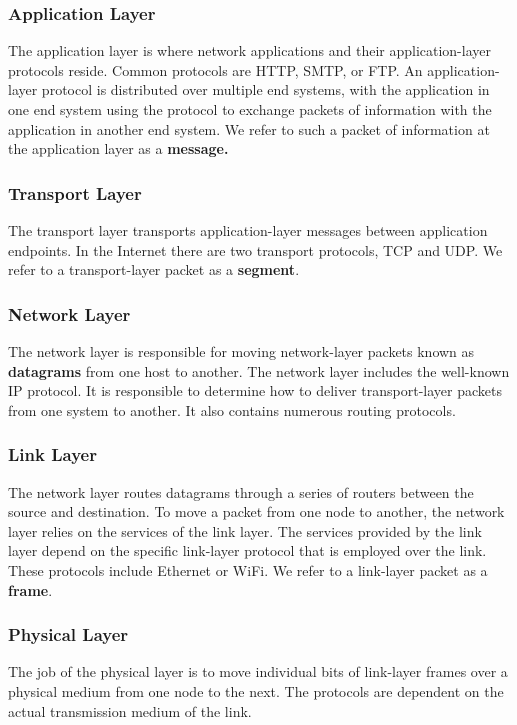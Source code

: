 \subsubsection{Application Layer}
The application layer is where network applications and their application-layer protocols reside. Common protocols are HTTP, SMTP, or FTP. An application-layer protocol is distributed over multiple end systems, with the application in one end system using the protocol to exchange packets of information with the application in another end system. We refer to such a packet of information at the application layer as a \textbf{message.}

\subsubsection{Transport Layer}
The transport layer transports application-layer messages between application endpoints. In the Internet there are two transport protocols, TCP and UDP. We refer to a transport-layer packet as a \textbf{segment}.

\subsubsection{Network Layer}
The network layer is responsible for moving network-layer packets known as \textbf{datagrams} from one host to another. The network layer includes the well-known IP protocol. It is responsible to determine how to deliver transport-layer packets from one system to another. It also contains numerous routing protocols.

\subsubsection{Link Layer}
The network layer routes datagrams through a series of routers between the source and destination. To move a packet from one node to another, the network layer relies on the services of the link layer. The services provided by the link layer depend on the specific link-layer protocol that is employed over the link. These protocols include Ethernet or WiFi. We refer to a link-layer packet as a \textbf{frame}.

\subsubsection{Physical Layer}
The job of the physical layer is to move individual bits of link-layer frames over a physical medium from one node to the next. The protocols are dependent on the actual transmission medium of the link.

